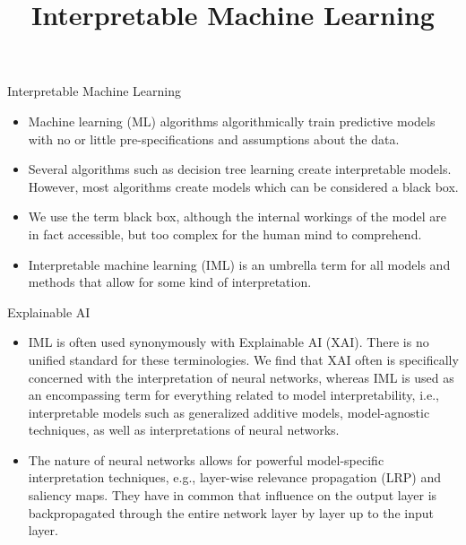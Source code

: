 \documentclass[11pt,compress,t,notes=noshow, xcolor=table]{beamer}
\title{Interpretable Machine Learning}
\institute{\href{https://compstat-lmu.github.io/lecture_iml/}{compstat-lmu.github.io/lecture\_iml}}
\date{}
\begin{document}


\newcommand{\titlefigure}{figure/open_blackbox}
\newcommand{\learninggoals}{
\item What is interpretable machine learning (IML) and Explainable Artificial Intelligence (XAI)?
\item What is interpretability?
\item What is the purpose of IML?
\item What are the fundamental terms and concepts of IML?}


\begin{vbframe}{Interpretable Machine Learning}
\begin{itemize}
\itemsep2em
\item Machine learning (ML) algorithms algorithmically train predictive models with no or little pre-specifications and assumptions about the data.
\item Several algorithms such as decision tree learning create interpretable models. However, most algorithms create models which can be considered a black box.
\item We use the term black box, although the internal workings of the model are in fact accessible, but too complex for the human mind to comprehend. 
\item Interpretable machine learning (IML) is an umbrella term for all models and methods that allow for some kind of interpretation.
\end{itemize}
\end{vbframe}

\begin{vbframe}{Explainable AI}
\begin{itemize}
\itemsep2em
\item IML is often used synonymously with Explainable AI (XAI). There is no unified standard for these terminologies. We find that XAI often is specifically concerned with the interpretation of neural networks, whereas IML is used as an encompassing term for everything related to model interpretability, i.e., interpretable models such as generalized additive models, model-agnostic techniques, as well as interpretations of neural networks.
\item The nature of neural networks allows for powerful model-specific interpretation techniques, e.g., layer-wise relevance propagation (LRP) and saliency maps. They have in common that influence on the output layer is backpropagated through the entire network layer by layer up to the input layer.
\end{itemize}
\end{vbframe}
\end{document}
